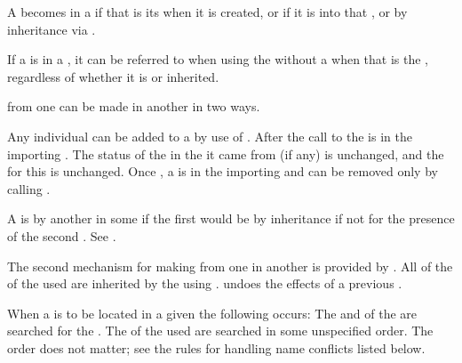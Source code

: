A  becomes  in a  
    if that is its  when it is created,
 or if it is  into that ,
 or by inheritance via .

If a  is  in a ,
it can be referred to when using the 
without a  when that  is the ,
regardless of whether it is  or inherited.


 from one  can be made  
in another  in two ways.

\beginlist 
\itemitem{--}
Any individual  can be added to a  by use
of .  After the call to  the
 is  in the importing .
The status of the  in the  
it came from (if any) is unchanged, and the  for
this  is unchanged.
Once , a  is  in the
importing 
and can be removed only by calling .

A  is  by another  
in some  if the first  would be 
by inheritance if not for the presence of the second .
See .

\itemitem{--}
The second mechanism for making  from one 
 in another is provided by .  
All of the  of the used  are inherited
by the using .
 undoes the effects of a previous .  
\endlist

\endsubsubsubsection%


When a  is to be located in a given  
the following occurs:
\beginlist 
\itemitem{--} The  and  of the 
 are searched for the .
\itemitem{--} The  of the used  are 
searched
in some unspecified order.  The
order does not matter; see the rules for handling name
conflicts listed below. 
\endlist

